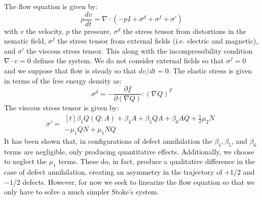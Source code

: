 \documentclass[reqno]{article}
\begin{document}
  The flow equation is given by:
  \begin{equation}
    \rho \frac{dv}{dt}
    =
    \nabla \cdot \left(
      -p I
      + \sigma^d
      + \sigma^f
      + \sigma'
    \right)
  \end{equation}
  with $v$ the velocity, $p$ the pressure, $\sigma^d$ the stress tensor from
  distortions in the nematic field,
  $\sigma^f$ the stress tensor from external fields (i.e. electric and
  magnetic), and $\sigma'$ the viscous stress tensor.
  This along with the incompressibility condition $\nabla \cdot v = 0$ defines
  the system.
  We do not consider external fields so that $\sigma^f = 0$ and we suppose that
  flow is steady so that $dv/dt = 0$.
  The elastic stress is given in terms of the free energy density as:
  \begin{equation}
    \sigma^d
    =
    - \frac{\partial f}{\partial (\nabla Q)} : \left( \nabla Q \right)^T
  \end{equation}
  The viscous stress tensor is given by:
  \begin{equation} \label{eq:viscous-stress-tensor}
    \sigma'
    =
    \begin{multlined}[t]
      \beta_1 Q \left( Q : A \right)
      + \beta_4 A
      + \beta_5 QA
      + \beta_6 AQ
      + \frac12 \mu_2 N \\
      - \mu_1 QN + \mu_1 NQ
    \end{multlined}
  \end{equation}
  It has been shown that, in configurations of defect annihilation the $\beta_1,
  \beta_5$, and $\beta_6$ terms are negligible, only producing quantitative
  effects.
  Additionally, we choose to neglect the $\mu_1$ terms.
  These do, in fact, produce a qualitative difference in the case of defect
  annihilation, creating an asymmetry in the trajectory of $+1/2$ and $-1/2$
  defects.
  However, for now we seek to linearize the flow equation so that we only have
  to solve a much simpler Stoke's system.
\end{document}
